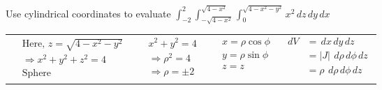 \documentclass[11pt]{extarticle}
\newcommand{\dx}{{\,dx}}
\newcommand{\dy}{{\,dy}}
\newcommand{\dz}{{\,dz}}
\newcommand{\dphi}{{\,d\phi}}
\newcommand{\drho}{{\,d\rho}}
\begin{document}
\pagebreak
\textbf{} Use cylindrical coordinates to evaluate $\int_{-2}^2 \int_{-\sqrt{4-x^2}}^{\sqrt{4-x^2}} \int_0^{\sqrt{4-x^2-y^2}} x^2 \dz\dy\dx$


\begin{tabularx}{\textwidth}{X|X|X|X}
   $\begin{aligned}
      & \text {Here, }
      z=\sqrt{4-x^2-y^2} \\
      & \Rightarrow x^2+y^2+z^2=4 \\
      & \text{Sphere}
   \end{aligned}$
   &
   $\begin{aligned}
      & x^2+y^2=4 \\
      & \Rightarrow \rho^2=4 \\
      & \Rightarrow \rho= \pm 2
   \end{aligned}$
   &
   $\begin{aligned}
      & x=\rho \cos \phi \\
      & y=\rho \sin \phi \\
      & z=z
   \end{aligned}$
   &
   $\begin{aligned}
      dV & = \dx\dy\dz \\
      & =|J| \ \drho\dphi\dz \\
      & =\rho \ \drho\dphi\dz \\
   \end{aligned}$
\end{tabularx}
\end{document}
